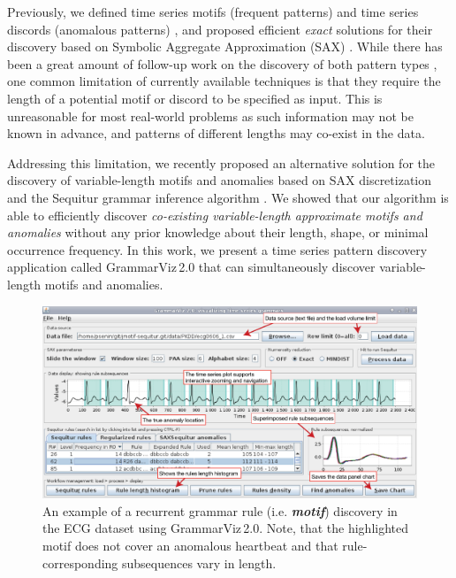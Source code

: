\documentclass{llncs}
\begin{document}
Previously, we defined time series motifs (frequent patterns) \cite{lin_motifs} and time series discords (anomalous patterns) \cite{hot_sax}, and proposed efficient \textit{exact} solutions for their discovery based on Symbolic Aggregate Approximation (SAX) \cite{sax}. While there has been a great amount of follow-up work on the discovery of both pattern types \cite{chan_anomaly}, one common limitation of currently available techniques is that they require the length of a potential motif or discord to be specified as input. This is unreasonable for most real-world problems as such information may not be known in advance, and patterns of different lengths may co-exist in the data.

Addressing this limitation, we recently proposed an alternative solution for the discovery of variable-length motifs \cite{grammarviz} and anomalies \cite{SAXSequitur14} based on SAX discretization and the Sequitur grammar inference algorithm \cite{sequitur}. We showed that our algorithm is able to efficiently discover \textit{co-existing variable-length approximate motifs and anomalies} without any prior knowledge about their length, shape, or minimal occurrence frequency. In this work, we present a time series pattern discovery application called \mbox{GrammarViz\,2.0} that can simultaneously discover variable-length motifs and anomalies. 

\begin{figure}[t]
   \centering
   \includegraphics[width=120mm]{Figure1-ECG0606.eps}
   \caption{An example of a recurrent grammar rule (i.e. \textbf{\textit{motif}}) discovery in the ECG dataset using \mbox{GrammarViz\,2.0}. Note, that the highlighted motif does not cover an anomalous heartbeat and that rule-corresponding subsequences vary in length.}
   \label{fig1}
\end{figure}
\end{document}
